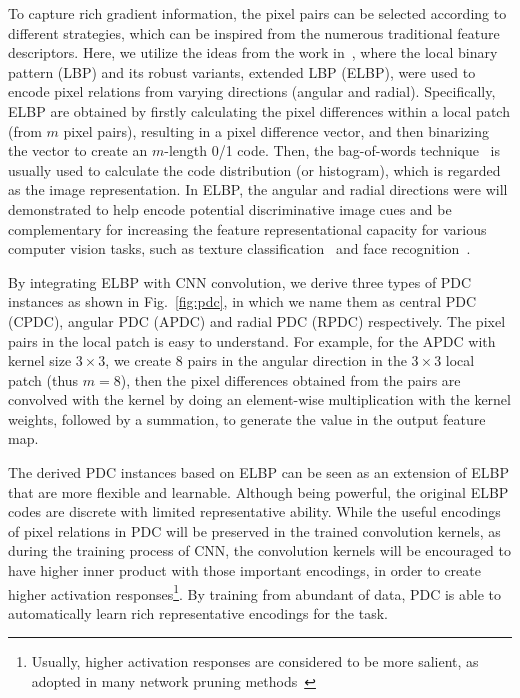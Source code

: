 \documentclass[10pt,twocolumn,letterpaper]{article}
\begin{document}
To capture rich gradient information, the pixel pairs can be selected according to different strategies, which can be inspired from the numerous traditional feature descriptors. Here, we utilize the ideas from the work in~\cite{ojala2002lbp,liu2012extended,su2019bird}, where the local binary pattern (LBP) and its robust variants, extended LBP (ELBP), were used to encode pixel relations from varying directions (angular and radial). Specifically, ELBP are obtained by firstly calculating the pixel differences within a local patch (from $m$ pixel pairs), resulting in a pixel difference vector, and then binarizing the vector to create an $m$-length 0/1 code. Then, the bag-of-words technique~\cite{liu2019bow} is usually used to calculate the code distribution (or histogram), which is regarded as the image representation. In ELBP, the angular and radial directions were will demonstrated to help encode potential discriminative image cues and be complementary for increasing the feature representational capacity for various computer vision tasks, such as texture classification~\cite{liu2012extended,liu2011sorted} and face recognition~\cite{su2019bird}.

By integrating ELBP with CNN convolution, we derive three types of PDC instances as shown in Fig.~\ref{fig:pdc}, in which we name them as central PDC (CPDC), angular PDC (APDC) and radial PDC (RPDC) respectively. The pixel pairs in the local patch is easy to understand. For example, for the APDC with kernel size $3\times 3$, we create 8 pairs in the angular direction in the $3\times 3$ local patch (thus $m=8$), then the pixel differences obtained from the pairs are convolved with the kernel by doing an element-wise multiplication with the kernel weights, followed by a summation, to generate the value in the output feature map.

The derived PDC instances based on ELBP can be seen as an extension of ELBP that are more flexible and learnable. Although being powerful, the original ELBP codes are discrete with limited representative ability. While the useful encodings of pixel relations in PDC will be preserved in the trained convolution kernels, as during the training process of CNN, the convolution kernels will be encouraged to have higher inner product with those important encodings, in order to create higher activation responses\footnote{Usually, higher activation responses are considered to be more salient, as adopted in many network pruning methods~\cite{han2015deepcompression,su2020dynamic}}. By training from abundant of data, PDC is able to automatically learn rich representative encodings for the task. 
\end{document}
